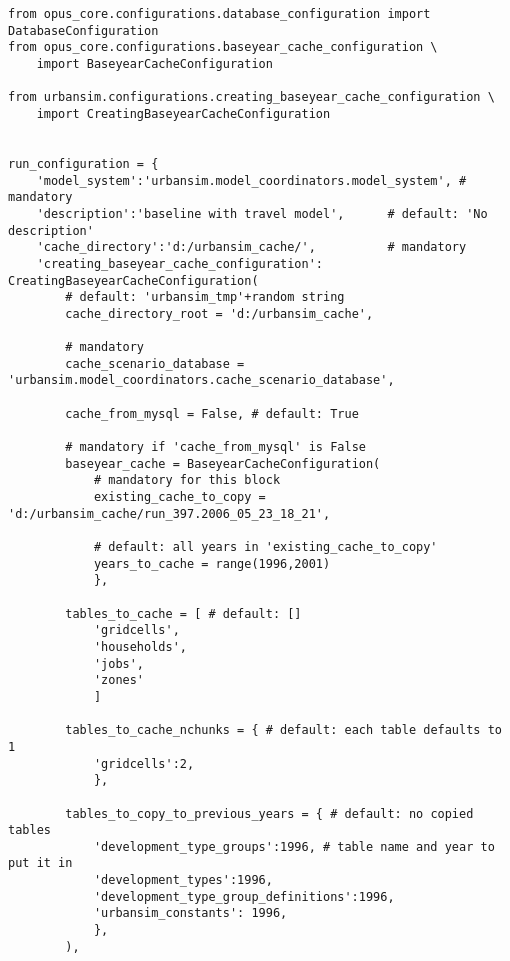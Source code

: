 \mysqlhostnameindex\mysqlpasswordindex\baseyearcacheindex
\begin{verbatim}
from opus_core.configurations.database_configuration import DatabaseConfiguration
from opus_core.configurations.baseyear_cache_configuration \
    import BaseyearCacheConfiguration
    
from urbansim.configurations.creating_baseyear_cache_configuration \
    import CreatingBaseyearCacheConfiguration


run_configuration = {
    'model_system':'urbansim.model_coordinators.model_system', # mandatory
    'description':'baseline with travel model',      # default: 'No description'
    'cache_directory':'d:/urbansim_cache/',	         # mandatory
    'creating_baseyear_cache_configuration': CreatingBaseyearCacheConfiguration(
        # default: 'urbansim_tmp'+random string
        cache_directory_root = 'd:/urbansim_cache',

        # mandatory
        cache_scenario_database = 'urbansim.model_coordinators.cache_scenario_database',

        cache_from_mysql = False, # default: True

        # mandatory if 'cache_from_mysql' is False
        baseyear_cache = BaseyearCacheConfiguration(
            # mandatory for this block
            existing_cache_to_copy = 'd:/urbansim_cache/run_397.2006_05_23_18_21',
            
            # default: all years in 'existing_cache_to_copy'
            years_to_cache = range(1996,2001)
            },

        tables_to_cache = [ # default: []
            'gridcells',
            'households',
            'jobs',
            'zones'
            ]

        tables_to_cache_nchunks = { # default: each table defaults to 1
            'gridcells':2,
            },

        tables_to_copy_to_previous_years = { # default: no copied tables
            'development_type_groups':1996, # table name and year to put it in
            'development_types':1996,
            'development_type_group_definitions':1996,
            'urbansim_constants': 1996,
            },
        ),
\end{verbatim}


